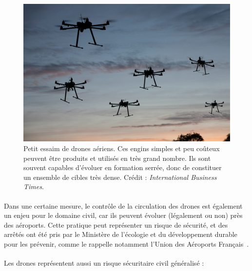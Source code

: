 	\begin{figure}[H]
		\centering
		\includegraphics[width=\textwidth]{figures/swarm}
		\caption{Petit essaim de drones aériens. Ces engins simples et peu coûteux peuvent être produits et utilisés en très grand nombre. Ils sont souvent capables d'évoluer en formation serrée, donc de constituer un ensemble de cibles très dense. Crédit : \emph{International Business Times}.}
		\label{fig:swarm}
	\end{figure}
	
	\paragraph*{}
	Dans une certaine mesure, le contrôle de la circulation des drones est également un enjeu pour le domaine civil, car ils peuvent évoluer (légalement ou non) près des aéroports. Cette pratique peut représenter un risque de sécurité, et des arrêtés ont été pris par le Ministère de l'écologie et du développement durable pour les prévenir, comme le rappelle notamment l'Union des Aéroports Français~\cite{dronesuaf}.
	
	\paragraph*{}
	Les drones représentent aussi un risque sécuritaire civil généralisé :
	
